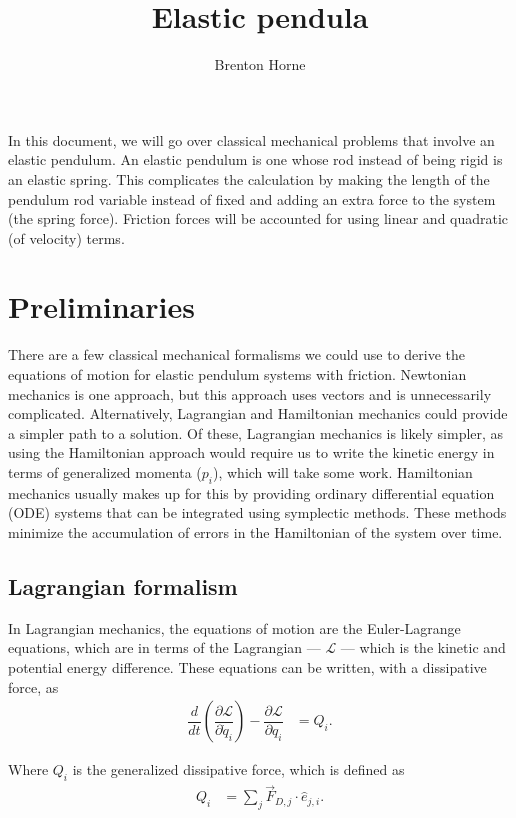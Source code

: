\documentclass[12pt,a4paper,portrait]{article}
\date{}
\title{Elastic pendula}
\author{Brenton Horne}
\newcommand{\lag}{\mathcal{L}}
\begin{document}
\maketitle

In this document, we will go over classical mechanical problems that involve an elastic pendulum. An elastic pendulum is one whose rod instead of being rigid is an elastic spring. This complicates the calculation by making the length of the pendulum rod variable instead of fixed and adding an extra force to the system (the spring force). Friction forces will be accounted for using linear and quadratic (of velocity) terms. 
\tableofcontents

\section{Preliminaries}
There are a few classical mechanical formalisms we could use to derive the equations of motion for elastic pendulum systems with friction. Newtonian mechanics is one approach, but this approach uses vectors and is unnecessarily complicated. Alternatively, Lagrangian and Hamiltonian mechanics could provide a simpler path to a solution. Of these, Lagrangian mechanics is likely simpler, as using the Hamiltonian approach would require us to write the kinetic energy in terms of generalized momenta ($p_i$), which will take some work. Hamiltonian mechanics usually makes up for this by providing ordinary differential equation (ODE) systems that can be integrated using symplectic methods. These methods minimize the accumulation of errors in the Hamiltonian of the system over time. 

\subsection{Lagrangian formalism}
In Lagrangian mechanics, the equations of motion are the Euler-Lagrange equations, which are in terms of the Lagrangian --- $\lag$ --- which is the kinetic and potential energy difference. These equations can be written, with a dissipative force, as
\begin{align}
	\dfrac{d}{dt}\left(\dfrac{\partial \lag}{\partial \dot{q}_i}\right) - \dfrac{\partial \lag}{\partial q_i} &= Q_i. \label{ELD}
\end{align}

Where $Q_i$ is the generalized dissipative force, which is defined as
\begin{align}
	Q_i &= \sum_{j} \vec{F}_{D,j} \cdot \hat{e}_{j,i}.\label{GDF}
\end{align}
\end{document}

